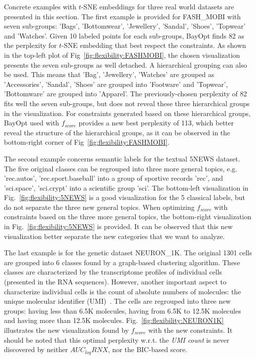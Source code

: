 Concrete examples with $t$-SNE embeddings for three real world datasets are presented in this section.
The first example is provided for {FASH\_MOBI} with seven sub-groups: 'Bags', 'Bottomwear', 'Jewellery', 'Sandal', 'Shoes', 'Topwear' and 'Watches'.
Given 10 labeled points for each sub-groups, BayOpt finds 82 as the perplexity for $t$-SNE embedding that best respect the constraints.
As shown in the top-left plot of Fig~\ref{fig:flexibility:FASHMOBI}, the chosen visualization presents the seven sub-groups as well detached.
A hierarchical grouping can also be used. This means that 'Bag', 'Jewellery', 'Watches' are grouped as 'Accessories', 'Sandal', 'Shoes' are grouped into 'Footware' and 'Topwear', 'Bottomware' are grouped into 'Apparel'.
The previously-chosen perplexity of 82 fits well the seven sub-groups, but does not reveal these three hierarchical groups in the visualization.
For constraints generated based on these hierarchical groups, BayOpt used with $f_{score}$ provides a new best perplexity of 113, which better reveal the structure of the hierarchical groups, as it can be observed in the bottom-right corner of Fig~\ref{fig:flexibility:FASHMOBI}.

The second example concerns semantic labels for the textual 5NEWS dataset.
The five original classes can be regrouped into three more general topics, e.g. 'rec.autos', 'rec.sport.baseball' into a group of sportive records 'rec', and 'sci.space', 'sci.crypt' into a scientific group 'sci'. The bottom-left visualization in Fig.~\ref{fig:flexibility:5NEWS} is a good visualization for the 5 classical labels, but do not separate the three new general topics. When optimizing $f_{score}$ with constraints based on the three more general topics, the bottom-right visualization in Fig.~\ref{fig:flexibility:5NEWS} is provided. It can be observed that this new visualization better separate the new categories that we want to analyze.

The last example is for the genetic dataset NEURON\_1K.
The original 1301 cells are grouped into 6 classes found by a graph-based clustering algorithm.
These classes are characterized by the transcriptome profiles of individual cells (presented in the RNA sequences).
However, another important aspect to characterize individual cells is the count of absolute numbers of molecules: the unique molecular identifier (UMI)~\cite{kivioja2011counting}. 
The cells are regrouped into three new groups: having less than 6.5K molecules, having from 6.5K to 12.5K molecules and having more than 12.5K molecules.
Fig.~\ref{fig:flexibility:NEURON1K} illustrates the new visualization found by $f_{score}$ with the new constraints.
It should be noted that this optimal perplexity w.r.t. the \emph{UMI count} is never discovered by neither $AUC_{log}RNX$, nor the BIC-based score.

